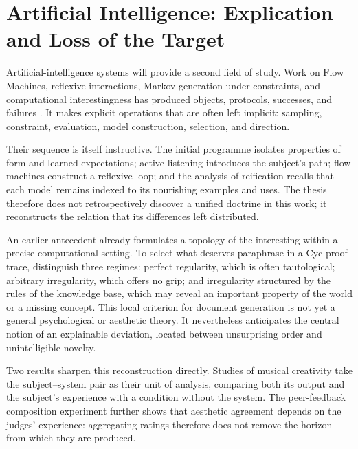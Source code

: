 \documentclass[11pt,a4paper]{article}
\begin{document}
\section{Artificial Intelligence: Explication and Loss of the Target}

Artificial-intelligence systems will provide a second field of study. Work on Flow
Machines, reflexive interactions, Markov generation under constraints, and
computational interestingness has produced objects, protocols, successes, and
failures
\parencite{pachet1999surprising,pachet1999active,pachet1999programs,pachet2000melodie,
pachet2002continuatorinteraction,pachet2004flowmachines,pachet2004reification,
pachet2004cybernetic,pachet2004childrenreflect,addessi2005experiments,
pachet2006clefs,pachet2006creativity,pachet2006reflective,pachet2008machines,
jones2009stimulating,pachet2006interactionsreflexives,addessi2006flowmachine,
aucouturier2002similarity,pachetroy2008hitsong,pachet2011hitsong,
lerch2011closedloop,
milipachet1995regularity,pachet2012virtuosity,martin2016creativeprocess,
pachet2021assisted,pachet2026markov}.
It makes explicit operations that are often left implicit: sampling,
constraint, evaluation, model construction, selection, and direction.

Their sequence is itself instructive. The initial programme isolates properties
of form and learned expectations; active listening introduces the subject's
path; flow machines construct a reflexive loop; and the analysis of reification
recalls that each model remains indexed to its nourishing examples and uses. The
thesis therefore does not retrospectively discover a unified doctrine in this
work; it reconstructs the relation that its differences left distributed.

An earlier antecedent already formulates a topology of the interesting within a
precise computational setting. To select what deserves paraphrase in a Cyc proof
trace, \textcite{milipachet1995regularity} distinguish three regimes: perfect
regularity, which is often tautological; arbitrary irregularity, which offers no
grip; and irregularity structured by the rules of the knowledge base, which may
reveal an important property of the world or a missing concept. This local
criterion for document generation is not yet a general psychological or
aesthetic theory. It nevertheless anticipates the central notion of an
explainable deviation, located between unsurprising order and unintelligible
novelty.

Two results sharpen this reconstruction directly. Studies of musical creativity
take the subject--system pair as their unit of analysis, comparing both its output
and the subject's experience with a condition without the system. The peer-feedback
composition experiment further shows that aesthetic agreement depends on the judges'
experience: aggregating ratings therefore does not remove the horizon from which they
are produced.
\end{document}
